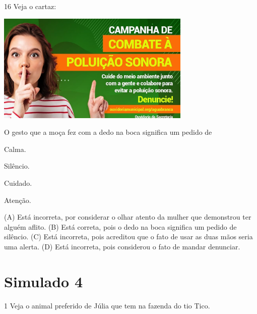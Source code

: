 \num{16} Veja o cartaz:

\includegraphics[width=3.64744in,height=2.05233in]{media/image173.png}


O gesto que a moça fez com a dedo na boca significa um pedido de

\begin{minipage}{.5\textwidth}
\begin{escolha}
\item Calma.

\item Silêncio.

\item Cuidado.

\item Atenção.
\end{escolha}
\end{minipage}

(A) Está incorreta, por considerar o olhar atento da mulher que demonstrou ter alguém aflito.
(B) Está correta, pois o dedo na boca significa um pedido de silêncio.
(C) Está incorreta, pois acreditou que o fato de usar as duas mãos seria uma alerta.
(D) Está incorreta, pois considerou o fato de mandar denunciar.

\chapter{Simulado 4}

\num{1} Veja o animal preferido de Júlia que tem na fazenda do tio Tico.

